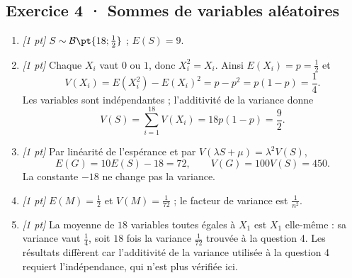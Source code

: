 \subsection*{Exercice 4 · Sommes de variables aléatoires}\begin{enumerate}

\item \textit{[1 pt]} $S\sim\mathcal B\pt{18;\frac{1}{2}}$ ; $E(S)=9$.

\item \textit{[1 pt]} Chaque $X_i$ vaut $0$ ou $1$, donc $X_i^2=X_i$. Ainsi $E(X_i)=p=\frac{1}{2}$ et
\[V(X_i)=E(X_i^2)-E(X_i)^2=p-p^2=p(1-p)=\frac{1}{4}.\]
Les variables sont indépendantes ; l'additivité de la variance donne
\[V(S)=\sum_{i=1}^{18}V(X_i)=18p(1-p)=\frac{9}{2}.\]

\item \textit{[1 pt]} Par linéarité de l'espérance et par $V(\lambda S+\mu)=\lambda^2V(S)$,
\[E(G)=10E(S)-18=72,\qquad V(G)=100V(S)=450.\]
La constante $-18$ ne change pas la variance.

\item \textit{[1 pt]} $E(M)=\frac{1}{2}$ et $V(M)=\frac{1}{72}$ ; le facteur de variance est $\frac{1}{n^2}$.

\item \textit{[1 pt]} La moyenne de $18$ variables toutes égales à $X_1$ est $X_1$ elle-même : sa variance vaut $\frac{1}{4}$, soit $18$ fois la variance $\frac{1}{72}$ trouvée à la question 4. Les résultats diffèrent car l'additivité de la variance utilisée à la question 4 requiert l'indépendance, qui n'est plus vérifiée ici.

\end{enumerate}

\fi

\fi

